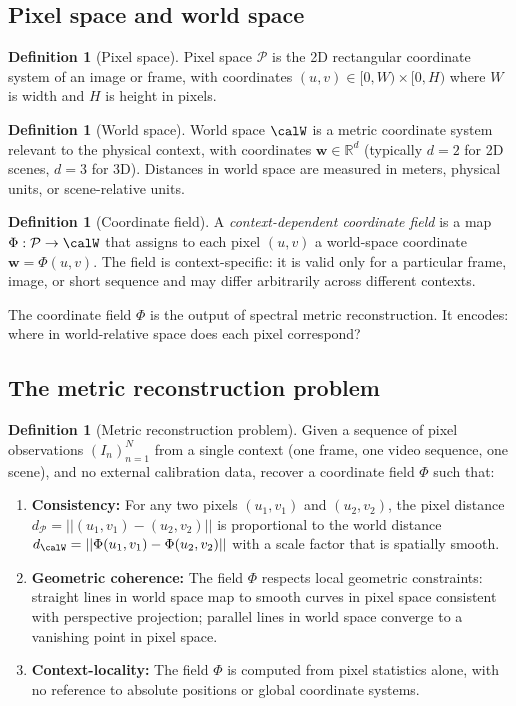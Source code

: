 \documentclass[11pt,twocolumn,a4paper]{article}
\theoremstyle{definition}
\newtheorem{definition}[theorem]{Definition}
\newcommand{\Real}{\mathbb{R}}
\newcommand{\calP}{\mathcal{P}}
\begin{document}
\subsection{Pixel space and world space}

\begin{definition}[Pixel space]
\label{def:pixelspace}
Pixel space $\calP$ is the 2D rectangular coordinate system of an image or frame, with coordinates $(u, v) \in [0, W) \times [0, H)$ where $W$ is width and $H$ is height in pixels.
\end{definition}

\begin{definition}[World space]
\label{def:worldspace}
World space $\calW$ is a metric coordinate system relevant to the physical context, with coordinates $\bm{w} \in \Real^d$ (typically $d=2$ for 2D scenes, $d=3$ for 3D). Distances in world space are measured in meters, physical units, or scene-relative units.
\end{definition}

\begin{definition}[Coordinate field]
\label{def:coordfield}
A \emph{context-dependent coordinate field} is a map $\Phi : \calP \to \calW$ that assigns to each pixel $(u,v)$ a world-space coordinate $\bm{w} = \Phi(u, v)$. The field is context-specific: it is valid only for a particular frame, image, or short sequence and may differ arbitrarily across different contexts.
\end{definition}

The coordinate field $\Phi$ is the output of spectral metric reconstruction. It encodes: where in world-relative space does each pixel correspond?

\subsection{The metric reconstruction problem}

\begin{definition}[Metric reconstruction problem]
\label{def:metric_problem}
Given a sequence of pixel observations $(I_n)_{n=1}^{N}$ from a single context (one frame, one video sequence, one scene), and no external calibration data, recover a coordinate field $\Phi$ such that:
\begin{enumerate}[leftmargin=1.4em]
  \item \textbf{Consistency:} For any two pixels $(u_1, v_1)$ and $(u_2, v_2)$, the pixel distance $d_\calP = ||(u_1, v_1) - (u_2, v_2)||$ is proportional to the world distance $d_\calW = ||\Phi(u_1, v_1) - \Phi(u_2, v_2)||$ with a scale factor that is spatially smooth.
  \item \textbf{Geometric coherence:} The field $\Phi$ respects local geometric constraints: straight lines in world space map to smooth curves in pixel space consistent with perspective projection; parallel lines in world space converge to a vanishing point in pixel space.
  \item \textbf{Context-locality:} The field $\Phi$ is computed from pixel statistics alone, with no reference to absolute positions or global coordinate systems.
\end{enumerate}
\end{definition}
\end{document}
